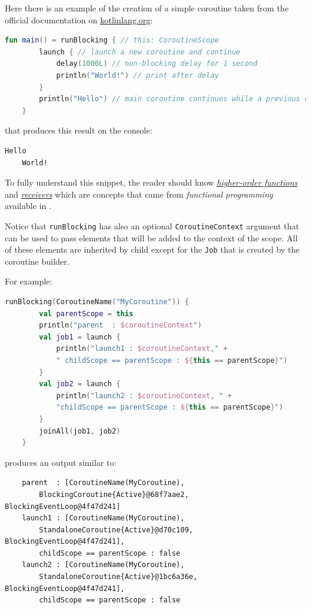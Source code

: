 Here there is an example of the creation of a simple coroutine taken from the official documentation on \href{https://kotlinlang.org/docs/coroutines-basics.html#your-first-coroutine}{kotlinlang.org}:
\begin{lstlisting}[language=kotlin]
	fun main() = runBlocking { // this: CoroutineScope
		launch { // launch a new coroutine and continue
			delay(1000L) // non-blocking delay for 1 second
			println("World!") // print after delay
		}
		println("Hello") // main coroutine continues while a previous one is delayed
	}
\end{lstlisting}

that produces this result on the console:
\begin{lstlisting}[numbers=none]
	Hello
	World!
\end{lstlisting}

To fully understand this snippet, the reader should know \href{https://kotlinlang.org/docs/lambdas.html#higher-order-functions}{\textit{higher-order functions}} and \href{https://kotlinlang.org/docs/lambdas.html#function-types}{\textit{receivers}} which are concepts that came from \textit{functional programming} available in \Kotlin.

Notice that \texttt{runBlocking} has also an optional \texttt{CoroutineContext} argument that can be used to pass elements that will be added to the context of the scope. All of these elements are inherited by child except for the \texttt{Job} that is created by the coroutine builder.

For example:
\begin{lstlisting}[language=Kotlin]
	runBlocking(CoroutineName("MyCoroutine")) {
		val parentScope = this
		println("parent  : $coroutineContext")
		val job1 = launch {
			println("launch1 : $coroutineContext," +
			" childScope == parentScope : ${this == parentScope}")
		}
		val job2 = launch {
			println("launch2 : $coroutineContext, " +
			"childScope == parentScope : ${this == parentScope}")
		}
		joinAll(job1, job2)
	}
\end{lstlisting}
produces an output similar to:
\begin{Verbatim}
	parent  : [CoroutineName(MyCoroutine),
		BlockingCoroutine{Active}@68f7aae2, BlockingEventLoop@4f47d241]
	launch1 : [CoroutineName(MyCoroutine),
		StandaloneCoroutine{Active}@d70c109, BlockingEventLoop@4f47d241],
		childScope == parentScope : false
	launch2 : [CoroutineName(MyCoroutine),
		StandaloneCoroutine{Active}@1bc6a36e, BlockingEventLoop@4f47d241],
		childScope == parentScope : false
\end{Verbatim}

